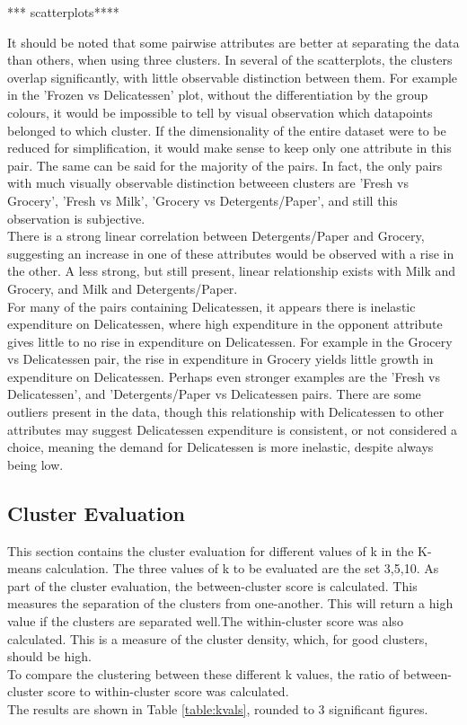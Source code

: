 \documentclass{article}
\begin{document}
*** scatterplots****

It should be noted that some pairwise attributes are better at separating the data than others, when using three clusters. In
several of the scatterplots, the clusters overlap significantly, with little observable distinction between them. For example in
the 'Frozen vs Delicatessen' plot, without the differentiation by the group colours, it would be impossible to tell by visual
observation which datapoints belonged to which cluster. If the dimensionality of the entire dataset were to be reduced for 
simplification, it would make sense to keep only one attribute in this pair. The same can be said for the majority of the pairs.
In fact, the only pairs with much visually observable distinction betweeen clusters are 'Fresh vs Grocery', 'Fresh vs Milk',
'Grocery vs Detergents/Paper', and still this observation is subjective. \\

There is a strong linear correlation between Detergents/Paper and Grocery, suggesting an increase in one of these attributes
would be observed with a rise in the other. A less strong, but still present, linear relationship exists with Milk and Grocery, 
and Milk and Detergents/Paper.\\ 

For many of the pairs containing Delicatessen, it appears there is inelastic expenditure on Delicatessen, where high expenditure in the
opponent attribute gives little to no rise in expenditure on Delicatessen. For example in the Grocery vs Delicatessen pair, the rise in
expenditure in Grocery yields little growth in expenditure on Delicatessen. Perhaps even stronger examples are the 'Fresh vs Delicatessen',
and 'Detergents/Paper vs Delicatessen pairs. There are some outliers present in the data, though this relationship with Delicatessen to 
other attributes may suggest Delicatessen expenditure is consistent, or not considered a choice, meaning the demand for Delicatessen is 
more inelastic, despite always being low.\\


\subsection{Cluster Evaluation} 

\noindent This section contains the cluster evaluation for different values of k in the K-means calculation. The three values of k to be evaluated
are the set {3,5,10}. As part of the cluster evaluation, the between-cluster score is calculated. This measures the separation of the clusters from one-another.
This will return a high value if the clusters are separated well.The within-cluster score was also calculated. This is a measure of the cluster density, which, for good clusters, should be high.\\
To compare the clustering between these different k values, the ratio of between-cluster score to within-cluster score was calculated.\\
The results are shown in Table \ref{table:kvals}, rounded to 3 significant figures.
\vspace{4mm}
\end{document}
